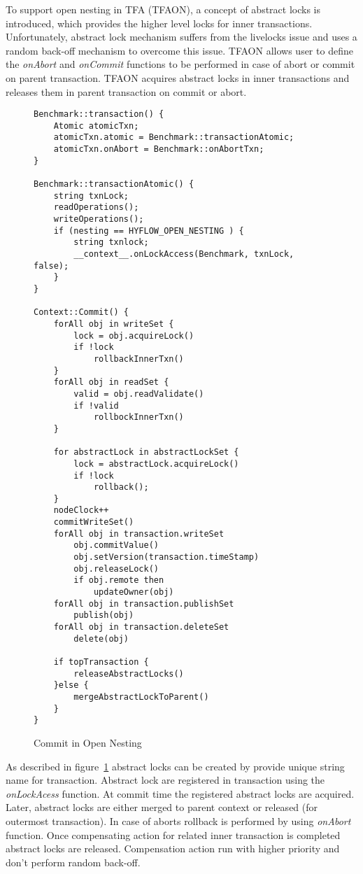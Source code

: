 \documentclass[12pt,english]{report}
\begin{document}
To support open nesting in TFA (TFAON), a concept of abstract locks is introduced, which provides the higher level locks for inner transactions. Unfortunately, abstract lock mechanism suffers from the livelocks issue and uses a random back-off mechanism to overcome this issue. TFAON allows user to define the \textit{onAbort} and \textit{onCommit} functions to be performed in case of abort or commit on parent transaction. TFAON acquires abstract locks in inner transactions and releases them in parent transaction on commit or abort. 

\begin{figure}
\begin{minipage}[b]{0.9\linewidth}\centering
\begin{lstlisting}
Benchmark::transaction() {
	Atomic atomicTxn;
	atomicTxn.atomic = Benchmark::transactionAtomic;
	atomicTxn.onAbort = Benchmark::onAbortTxn;
}

Benchmark::transactionAtomic() {
    string txnLock;
	readOperations();
	writeOperations();
	if (nesting == HYFLOW_OPEN_NESTING ) {
		string txnlock;
		__context__.onLockAccess(Benchmark, txnLock, false);	
	}
}	

Context::Commit() {
	forAll obj in writeSet {
		lock = obj.acquireLock()
		if !lock
			rollbackInnerTxn()
	}
	forAll obj in readSet {
		valid = obj.readValidate()
		if !valid
			rollbockInnerTxn()
	}
	
	for abstractLock in abstractLockSet {
		lock = abstractLock.acquireLock()
		if !lock
			rollback();
	}
	nodeClock++
	commitWriteSet()
	forAll obj in transaction.writeSet
		obj.commitValue()
 		obj.setVersion(transaction.timeStamp)
 		obj.releaseLock()
 		if obj.remote then
 			updateOwner(obj)
	forAll obj in transaction.publishSet
		publish(obj)
	forAll obj in transaction.deleteSet
		delete(obj)
		
	if topTransaction {
		releaseAbstractLocks()
	}else {
		mergeAbstractLockToParent()
	}	
}
\end{lstlisting}
\end{minipage}
\caption{Commit in Open Nesting}
\label{Fig:OpenNestingCommit}
\end{figure}

As described in figure~\ref{Fig:OpenNestingCommit} abstract locks can be created by provide unique string name for transaction. Abstract lock are registered in transaction using the \textit{onLockAcess} function. At commit time the registered abstract locks are acquired. Later, abstract locks are either merged to parent context or released (for outermost transaction). In case of aborts rollback is performed by using \textit{onAbort} function. Once compensating action for related inner transaction is completed abstract locks are released. Compensation action run with higher priority and don't perform random back-off.   
\end{document}
